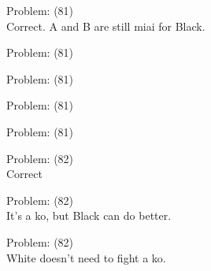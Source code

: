 \documentclass[11pt]{article}
\begin{document}
\begin{minipage}[t]{0.5\textwidth}
  {\centering
  
  Problem: (81)\\
  Correct. A and B are still miai for Black.\\
  }
\end{minipage}
\begin{minipage}[t]{0.5\textwidth}
  {\centering
  
  Problem: (81)\\
  
  }
\end{minipage}
\begin{minipage}[t]{0.5\textwidth}
  {\centering
  
  Problem: (81)\\
  
  }
\end{minipage}
\begin{minipage}[t]{0.5\textwidth}
  {\centering
  
  Problem: (81)\\
  
  }
\end{minipage}
\begin{minipage}[t]{0.5\textwidth}
  {\centering
  
  Problem: (81)\\
  
  }
\end{minipage}
\begin{minipage}[t]{0.5\textwidth}
  {\centering
  
  Problem: (82)\\
  Correct\\
  }
\end{minipage}
\begin{minipage}[t]{0.5\textwidth}
  {\centering
  
  Problem: (82)\\
  It's a ko, but Black can do better.\\
  }
\end{minipage}
\begin{minipage}[t]{0.5\textwidth}
  {\centering
  
  Problem: (82)\\
  White doesn't need to fight a ko.\\
  }
\end{minipage}
\end{document}
